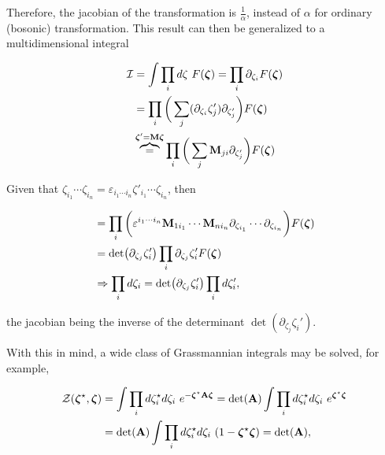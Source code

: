 \documentclass{homework}
\begin{document}
\begin{itemize}
\begin{tcolorbox}[title = Transformation of Grassmann variables]
Therefore, the jacobian of the transformation is $\frac{1}{\alpha}$, instead of $\alpha$ for ordinary (bosonic) transformation. This result can then be generalized to a multidimensional integral 

\end{tcolorbox}
\begin{tcolorbox}

\begin{equation}
    \begin{split}
        \mathcal{I} &= \int \prod_{i} d\zeta \textnormal{ } F(\bm{\zeta}) = \prod_{i} \partial_{\zeta_i} F(\bm{\zeta}) \\
        &= \prod_{i} \bigg(\sum_{j} (\partial_{\zeta_i} \zeta_j') \partial_{\zeta_j'}\bigg) F(\bm{\zeta})\\
        & \overbrace{=}^{\bm{\zeta}' = {\bf M} \bm{\zeta}} \prod_{i} \bigg(\sum_{j} {{\bf M}}_{ji} \partial_{\zeta_j'}\bigg) F(\bm{\zeta})\\
     \end{split} 
\end{equation}

Given that $\zeta_{i_1} \cdots \zeta_{i_n} = \varepsilon_{i_1 \cdots i_n} \zeta'_{i_1} \cdots \zeta_{i_n} $, then

\begin{equation}
    \begin{split}
        &= \prod_{i} \bigg(\varepsilon^{i_1 \cdots i_n} {{\bf M}}_{1i_1} \cdots  {{\bf M}}_{ni_n} \partial_{\zeta_{ i_1}} \cdots \partial_{\zeta_{i_n}} \bigg) F(\bm{\zeta}) \\
        &= \det(\partial_{\zeta_j} \zeta_i') \prod_{i} \partial_{\zeta_j} \zeta_i' F(\bm{\zeta}) \\
        &\Rightarrow \prod_{i} d\zeta_i = \det(\partial_{\zeta_j} \zeta_i') \prod_{i} d{\zeta_i'},
    \end{split}
\end{equation}

the jacobian being the inverse of the determinant $\det(\partial_{\zeta_j} \zeta_i')$.
\end{tcolorbox}

With this in mind, a wide class of Grassmannian integrals may be solved, for example, 

\begin{equation}
\begin{split}
    \mathcal{Z}(\bm{\zeta}^\star,\bm{\zeta}) &= \int \prod_{i} d{\zeta}_i^\star d{\zeta}_i \textnormal{ } e^{- \bm{\zeta}^\star {\bf A} \bm{\zeta}} = \det (\bf A) \int \prod_{i} d{\zeta}_i^\star d{\zeta}_i \textnormal{ } e^{\bm{\zeta}^\star \bm{\zeta}} \\
    &= \det (\bf A) \int \prod_{i} d{\zeta}_i^\star d{\zeta}_i \textnormal{ } (1 - {\bm{\zeta}^\star \bm{\zeta}}) = \det (\bf A),
\end{split}
\end{equation}
\end{itemize}
\end{document}

